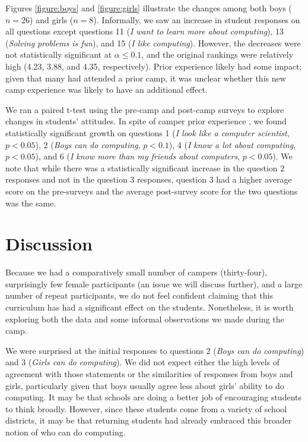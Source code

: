 Figures \ref{figure:boys} and \ref{figure:girls} illustrate the changes
among both boys ($n=26$) and girls ($n=8$).
Informally, we saw an increase in student responses on all questions
except questions 11 (\textit{I want to learn more about computing}), 
13 (\textit{Solving problems is fun}), and 15 (\textit{I like computing}).
However, the decreases were not statistically significant at $\alpha\le 0.1$,
and the original rankings were relatively high (4.23, 3.88, and 4.35,
respectively).  Prior experience likely had some impact;
given that many had attended a prior camp, it was unclear whether this
new camp experience was likely to have an additional effect.

We ran a paired t-test using the pre-camp and post-camp surveys to
explore changes in students' attitudes.  In spite of camper prior
experience , we found statistically significant growth on questions
1 (\textit{I look like a computer scientist}, $p < 0.05$), 2
(\textit{Boys can do computing}, $p < 0.1$), 4 (\textit{I know a
lot about computing}, $p < 0.05$), and 6 (\textit{I know more than
my friends about computers}, $p < 0.05$).  We note that while there
was a statistically significant increase in the question 2 responses
and not in the question 3 responses, question 3 had a higher average
score on the pre-surveys and the average post-survey score for the two
questions was the same.


\section{Discussion}

Because we had a comparatively small number of campers (thirty-four),
surprisingly few female participants (an issue we will discuss
further), and a large number of repeat participants, we do not feel
confident claiming that this curriculum has had a significant effect
on the students.  Nonetheless, it is worth exploring both the data
and some informal observations we made during the camp.

We were surprised at the initial responses to questions 2 (\textit{Boys
can do computing}) and 3 (\textit{Girls can do computing}).  We did
not expect either the high levels of agreement with those statements
or the similarities of responses from boys and girls, particularly
given that boys usually agree less about girls' ability to do
computing.  It may be that schools are doing a better job of
encouraging students to think broadly.  However, since these students
come from a variety of school districts, it may be that returning
students had already embraced this broader notion of who can do
computing.

